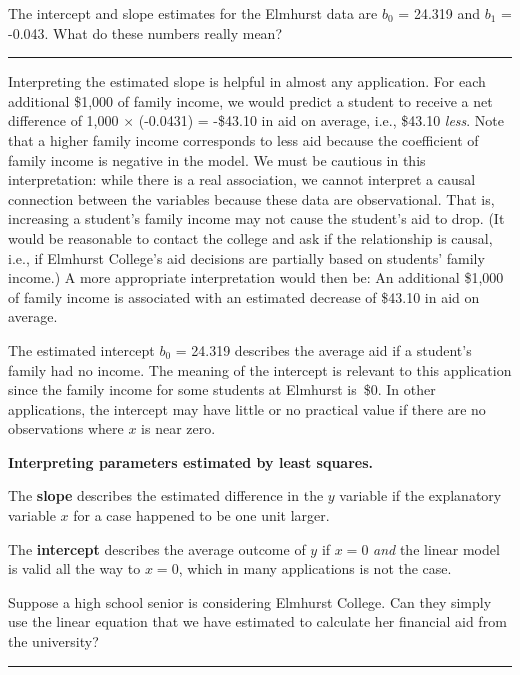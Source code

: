 \documentclass[
  10pt,
  openany]{book}
\theoremstyle{definition}
\theoremstyle{definition}
\theoremstyle{definition}
\theoremstyle{definition}
\theoremstyle{remark}
\begin{document}
The intercept and slope estimates for the Elmhurst data are \(b_0\) = 24.319 and \(b_1\) = -0.043.
What do these numbers really mean?

\begin{center}\rule{0.5\linewidth}{0.5pt}\end{center}

Interpreting the estimated slope is helpful in almost any application.
For each additional \$1,000 of family income, we would predict a student to receive a net difference of 1,000 \(\times\) (-0.0431) = -\$43.10 in aid on average, i.e., \$43.10 \emph{less}.
Note that a higher family income corresponds to less aid because the coefficient of family income is negative in the model.
We must be cautious in this interpretation: while there is a real association, we cannot interpret a causal connection between the variables because these data are observational.
That is, increasing a student's family income may not cause the student's aid to drop. (It would be reasonable to contact the college and ask if the relationship is causal, i.e., if Elmhurst College's aid decisions are partially based on students' family income.) A more appropriate interpretation would then be: An additional \$1,000 of family income is associated with an estimated decrease of \$43.10 in aid on average.

The estimated intercept \(b_0\) = 24.319 describes the average aid if a student's family had no income.
The meaning of the intercept is relevant to this application since the family income for some students at Elmhurst is~\$0.
In other applications, the intercept may have little or no practical value if there are no observations where \(x\) is near zero.

\textbf{Interpreting parameters estimated by least squares.}

The \textbf{slope} describes the estimated difference in the \(y\) variable if the explanatory variable \(x\) for a case happened to be one unit larger.

The \textbf{intercept} describes the average outcome of \(y\) if \(x=0\) \emph{and} the linear model is valid all the way to \(x=0\), which in many applications is not the case.

Suppose a high school senior is considering Elmhurst College.
Can they simply use the linear equation that we have estimated to calculate her financial aid from the university?

\begin{center}\rule{0.5\linewidth}{0.5pt}\end{center}
\end{document}
